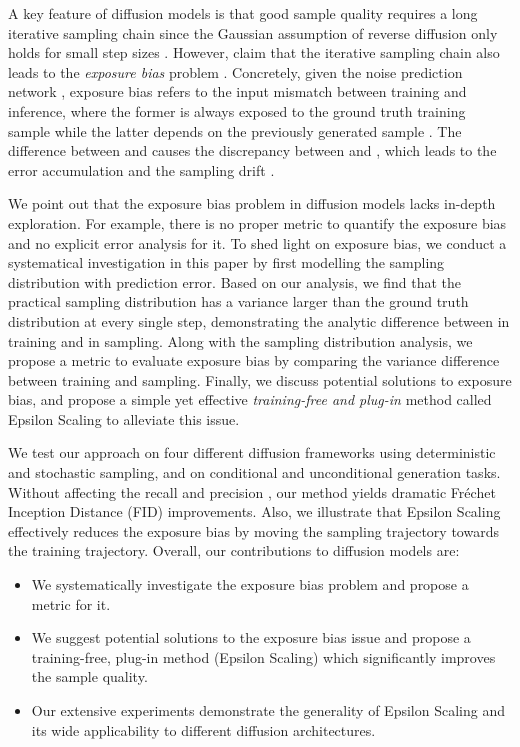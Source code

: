 \documentclass{article} \usepackage{iclr2024_conference,times}
\begin{document}
A key feature of diffusion models is that good sample quality requires a long iterative sampling chain since the Gaussian assumption of reverse diffusion only holds for small step sizes \citep{xiao2022tackling}. However, \citet{ning2023input} claim that the iterative sampling chain also leads to the 
\textit{exposure bias} problem \citep{DBLP:journals/corr/RanzatoCAZ15,DBLP:conf/emnlp/Schmidt19}. Concretely, given the noise prediction network , exposure bias refers to the input mismatch between training and inference, where the former is always exposed to the ground truth training sample  while the latter depends on the previously generated sample . The difference between  and  causes the discrepancy between  and , which leads to the error accumulation and the sampling drift \citep{li2023alleviating}. 

We point out that the exposure bias problem in diffusion models lacks in-depth exploration. For example, there is no proper metric to quantify the exposure bias and no explicit error analysis for it. To shed light on exposure bias, we conduct a systematical investigation in this paper by first modelling the sampling distribution with prediction error. Based on our analysis, we find that the practical sampling distribution has a variance larger than the ground truth distribution at every single step, demonstrating the analytic difference between  in training and  in sampling. Along with the sampling distribution analysis, we propose a metric  to evaluate exposure bias by comparing the variance difference between training and sampling. Finally, we discuss potential solutions to exposure bias, and propose a simple yet effective \textit{training-free and plug-in} method called Epsilon Scaling to alleviate this issue. 

We test our approach on four different diffusion frameworks using deterministic and stochastic sampling, and on conditional and unconditional generation tasks. Without affecting the recall and precision \citep{kynkaanniemi2019improved}, our method yields dramatic Fréchet Inception Distance (FID) \citep{FID} improvements. Also, we illustrate that Epsilon Scaling effectively reduces the exposure bias by moving the sampling trajectory towards the training trajectory. Overall, our contributions to diffusion models are:
\begin{itemize}
    \item We systematically investigate the exposure bias problem and propose a metric for it.
    \item We suggest potential solutions to the exposure bias issue and propose a training-free, plug-in method (Epsilon Scaling) which significantly improves the sample quality.
    \item Our extensive experiments demonstrate the generality of Epsilon Scaling and its wide applicability to different diffusion architectures.
\end{itemize}
\end{document}
